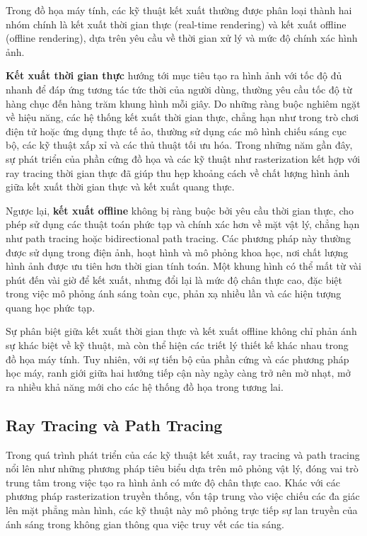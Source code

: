 Trong đồ họa máy tính, các kỹ thuật kết xuất thường được phân loại thành hai nhóm chính là kết xuất thời gian thực (real-time rendering) và kết xuất offline (offline rendering), dựa trên yêu cầu về thời gian xử lý và mức độ chính xác hình ảnh.

\textbf{Kết xuất thời gian thực} hướng tới mục tiêu tạo ra hình ảnh với tốc độ đủ nhanh để đáp ứng tương tác tức thời của người dùng, thường yêu cầu tốc độ từ hàng chục đến hàng trăm khung hình mỗi giây. Do những ràng buộc nghiêm ngặt về hiệu năng, các hệ thống kết xuất thời gian thực, chẳng hạn như trong trò chơi điện tử hoặc ứng dụng thực tế ảo, thường sử dụng các mô hình chiếu sáng cục bộ, các kỹ thuật xấp xỉ và các thủ thuật tối ưu hóa. Trong những năm gần đây, sự phát triển của phần cứng đồ họa và các kỹ thuật như rasterization kết hợp với ray tracing thời gian thực đã giúp thu hẹp khoảng cách về chất lượng hình ảnh giữa kết xuất thời gian thực và kết xuất quang thực.

Ngược lại, \textbf{kết xuất offline} không bị ràng buộc bởi yêu cầu thời gian thực, cho phép sử dụng các thuật toán phức tạp và chính xác hơn về mặt vật lý, chẳng hạn như path tracing hoặc bidirectional path tracing. Các phương pháp này thường được sử dụng trong điện ảnh, hoạt hình và mô phỏng khoa học, nơi chất lượng hình ảnh được ưu tiên hơn thời gian tính toán. Một khung hình có thể mất từ vài phút đến vài giờ để kết xuất, nhưng đổi lại là mức độ chân thực cao, đặc biệt trong việc mô phỏng ánh sáng toàn cục, phản xạ nhiều lần và các hiện tượng quang học phức tạp.

Sự phân biệt giữa kết xuất thời gian thực và kết xuất offline không chỉ phản ánh sự khác biệt về kỹ thuật, mà còn thể hiện các triết lý thiết kế khác nhau trong đồ họa máy tính. Tuy nhiên, với sự tiến bộ của phần cứng và các phương pháp học máy, ranh giới giữa hai hướng tiếp cận này ngày càng trở nên mờ nhạt, mở ra nhiều khả năng mới cho các hệ thống đồ họa trong tương lai.

\subsection{Ray Tracing và Path Tracing}

Trong quá trình phát triển của các kỹ thuật kết xuất, ray tracing và path tracing nổi lên như những phương pháp tiêu biểu dựa trên mô phỏng vật lý, đóng vai trò trung tâm trong việc tạo ra hình ảnh có mức độ chân thực cao. Khác với các phương pháp rasterization truyền thống, vốn tập trung vào việc chiếu các đa giác lên mặt phẳng màn hình, các kỹ thuật này mô phỏng trực tiếp sự lan truyền của ánh sáng trong không gian thông qua việc truy vết các tia sáng.

